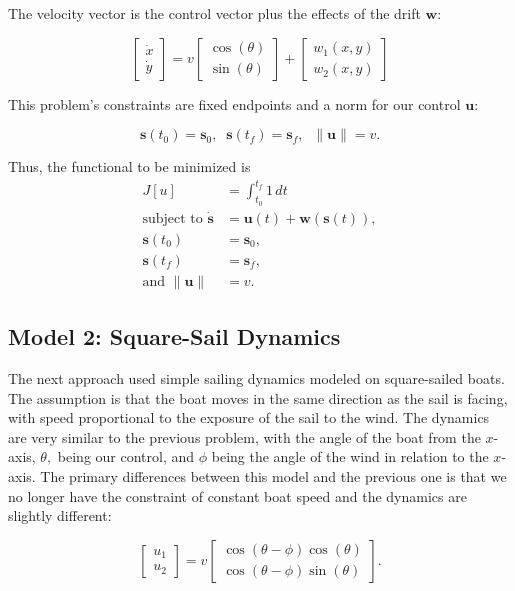 \documentclass[11pt]{amsart}
\begin{document}
The velocity vector is the control vector plus the effects of the drift $\mathbf w$:

$$ \begin{bmatrix} \dot{x} \\ \dot{y} \end{bmatrix} = v \begin{bmatrix} \cos(\theta) \\ \sin(\theta) \end{bmatrix} + \begin{bmatrix} w_1(x, y) \\ w_2(x, y) \end{bmatrix}$$

This problem's constraints are fixed endpoints and a norm for our control $\mathbf{u}$:

$$\mathbf{s}(t_0) = \mathbf{s}_0, \;\; \mathbf{s}(t_f) = \mathbf{s}_f, \;\; \| \mathbf{u} \| = v.$$

Thus, the functional to be minimized is
\begin{align*}
    J[u] &= \int_{t_0}^{t_f} 1 \,dt\\
    \text{subject to } \dot{\mathbf{s}} &= \mathbf{u}(t) + \mathbf{w}(\mathbf{s}(t)),\\
    \mathbf{s}(t_0) &= \mathbf{s}_0,\\
    \mathbf{s}(t_f) &= \mathbf{s}_f,\\
    \text{and } \| \mathbf{u} \| &= v.
\end{align*}

\subsection{Model 2: Square-Sail Dynamics}
\label{sec:model2}

\par The next approach used simple sailing dynamics modeled on square-sailed boats. The assumption is that the boat moves in the same direction as the sail is facing, with speed proportional to the exposure of the sail to the wind. The dynamics are very similar to the previous problem, with the angle of the boat from the $x$-axis, $\theta,$ being our control, and $\phi$ being the angle of the wind in relation to the $x$-axis. The primary differences between this model and the previous one is that we no longer have the constraint of constant boat speed and the dynamics are slightly different:

$$ \begin{bmatrix} u_1 \\ u_2 \end{bmatrix} = v \begin{bmatrix} \cos(\theta - \phi) \cos(\theta) \\ \cos(\theta - \phi) \sin(\theta) \end{bmatrix}.$$
\end{document}
